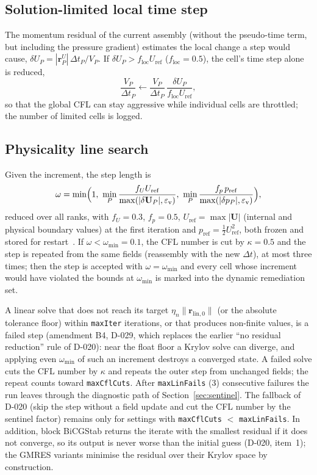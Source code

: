 \documentclass[11pt,a4paper]{article}
\newcommand{\vect}[1]{\mathbf{#1}}
\newcommand{\Uv}{\vect{U}}
\newcommand{\dt}{\Delta t}
\newcommand{\VSMALL}{\varepsilon_{\mathrm{v}}}
\newcommand{\code}[1]{\texttt{#1}}
\begin{document}
\subsection{Solution-limited local time step}\label{sec:loclim}

The momentum residual of the current assembly (without the pseudo-time term,
but including the pressure gradient) estimates the local change a step would
cause, $\delta U_P = |\vect r^{U}_P|\,\dt_P/V_P$. If
$\delta U_P > f_{\mathrm{loc}}U_{\mathrm{ref}}$ ($f_{\mathrm{loc}}=0.5$), the
cell's time step alone is reduced,
\begin{equation}
  \frac{V_P}{\dt_P}\leftarrow\frac{V_P}{\dt_P}\,
  \frac{\delta U_P}{f_{\mathrm{loc}}U_{\mathrm{ref}}},
  \label{eq:loclim}
\end{equation}
so that the global CFL can stay aggressive while individual cells are
throttled; the number of limited cells is logged.

\subsection{Physicality line search}\label{sec:ls}

Given the increment, the step length is
\begin{equation}
  \omega = \min\Bigl(1,\ \min_P\frac{f_UU_{\mathrm{ref}}}{\max(|\delta\Uv_P|,\VSMALL)},\
  \min_P\frac{f_p\,p_{\mathrm{ref}}}{\max(|\delta p_P|,\VSMALL)}\Bigr),
  \label{eq:ls}
\end{equation}
reduced over all ranks, with $f_U=0.3$, $f_p=0.5$,
$U_{\mathrm{ref}}=\max|\Uv|$ (internal and physical boundary values) at the
first iteration and $p_{\mathrm{ref}}=\tfrac12U_{\mathrm{ref}}^2$, both frozen
and stored for restart~\cite{Ceze2013AIAA}. If $\omega<\omega_{\min}=0.1$, the
CFL number is cut by $\kappa=0.5$ and the step is repeated from the same
fields (reassembly with the new $\dt$), at most three times; then the step is
accepted with $\omega=\omega_{\min}$ and every cell whose increment would
have violated the bounds at $\omega_{\min}$ is marked into the dynamic
remediation set.

A linear solve that does not reach its target $\eta_n\|\vect r_{\mathrm{lin},0}\|$
(or the absolute tolerance floor) within \code{maxIter} iterations, or that
produces non-finite values, is a failed step (amendment B4, D-029, which
replaces the earlier ``no residual reduction'' rule of D-020): near the
float floor a Krylov solve can diverge, and applying even $\omega_{\min}$ of
such an increment destroys a converged state. A failed solve cuts the CFL
number by $\kappa$ and repeats the outer step from unchanged fields; the
repeat counts toward \code{maxCflCuts}. After \code{maxLinFails} (3)
consecutive failures the run leaves through the diagnostic path of
Section~\ref{sec:sentinel}. The fallback of D-020 (skip the step without a
field update and cut the CFL number by the sentinel factor) remains only for
settings with \code{maxCflCuts} $<$ \code{maxLinFails}. In addition, block
BiCGStab returns the iterate with the smallest residual if it does not
converge, so its output is never worse than the initial guess (D-020, item~1);
the GMRES variants minimise the residual over their Krylov space by
construction.
\end{document}
